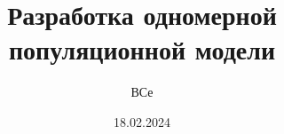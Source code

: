 \documentclass[utf8x,final]{G7-32} %
\title{Разработка одномерной популяционной модели}
\author{ВСе}
\date{18.02.2024}
\begin{document}



%

\renewcommand{\student}{Юхневич Егор Владимирович}
\renewcommand{\group}{группы БПМИ 235, 3 курса}




%


\tableofcontents





\mainmatter %

%
%
%
%
        

%
%
 

\backmatter %



%

\appendix   %

% 
% 
% 
\end{document}
